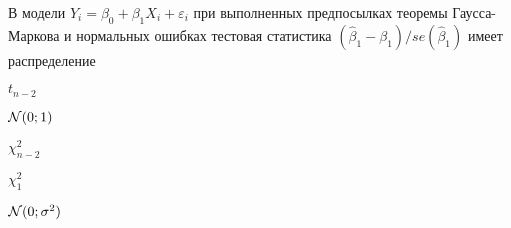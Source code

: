 
\begin{question}
В модели \(Y_i = \beta_0 + \beta_1 X_i + \varepsilon_i\) при выполненных
предпосылках теоремы Гаусса-Маркова и нормальных ошибках тестовая
статистика \((\hat\beta_1 - \beta_1)/se(\hat\beta_1)\) имеет
распределение
\begin{answerlist}
  \item \(t_{n-2}\)
  \item \(\mathcal{N}(0;1)\)
  \item \(\chi^2_{n-2}\)
  \item \(\chi^2_1\)
  \item \(\mathcal{N}(0;\sigma^2)\)
\end{answerlist}
\end{question}


